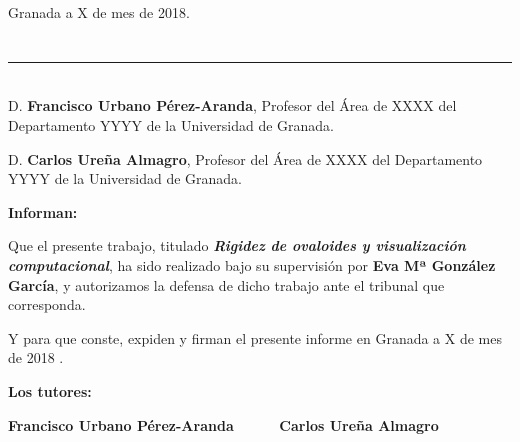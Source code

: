 \begin{flushright}
Granada a X de mes de 2018.
\end{flushright}


\chapter*{}
\thispagestyle{empty}

\noindent\rule[-1ex]{\textwidth}{2pt}\\[4.5ex]

D. \textbf{Francisco Urbano Pérez-Aranda}, Profesor del Área de XXXX del Departamento YYYY de la Universidad de Granada.

\vspace{0.5cm}

D. \textbf{Carlos Ureña Almagro}, Profesor del Área de XXXX del Departamento YYYY de la Universidad de Granada.


\vspace{0.5cm}

\textbf{Informan:}

\vspace{0.5cm}

Que el presente trabajo, titulado \textit{\textbf{Rigidez de ovaloides y visualización computacional}},
ha sido realizado bajo su supervisión por \textbf{Eva Mª González García}, y autorizamos la defensa de dicho trabajo ante el tribunal que corresponda.

\vspace{0.5cm}

Y para que conste, expiden y firman el presente informe en Granada a X de mes de 2018 .

\vspace{1cm}

\textbf{Los tutores:}

\vspace{5cm}

\noindent \textbf{Francisco Urbano Pérez-Aranda \ \ \ \ \ Carlos Ureña Almagro}





